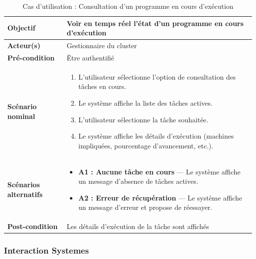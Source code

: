 \documentclass[12pt,a4paper]{report}
\theoremstyle{definition}
\begin{document}
\begin{table}[H]
\centering
\renewcommand{\arraystretch}{1.3}

\begin{tabular}{|p{4cm}|p{11cm}|}
\hline

\textbf{Objectif} & Voir en temps réel l'état d'un programme en cours d'exécution \\ 
\hline

\textbf{Acteur(s)} & Gestionnaire du cluster \\ 
\hline

\textbf{Pré-condition} & Être authentifié \\ 
\hline

\textbf{Scénario nominal} & 
\begin{enumerate}
    \item L'utilisateur sélectionne l'option de consultation des tâches en cours.
    \item Le système affiche la liste des tâches actives.
    \item L'utilisateur sélectionne la tâche souhaitée.
    \item Le système affiche les détails d'exécution (machines impliquées, pourcentage d'avancement, etc.).
\end{enumerate} \\ 
\hline

\textbf{Scénarios alternatifs} & 
\begin{itemize}
    \item \textbf{A1 : Aucune tâche en cours} — Le système affiche un message d'absence de tâches actives.
    \item \textbf{A2 : Erreur de récupération} — Le système affiche un message d'erreur et propose de réessayer.
\end{itemize} \\ 
\hline

\textbf{Post-condition} & Les détails d'exécution de la tâche sont affichés \\ 
\hline

\end{tabular}

\caption{Cas d’utilisation : Consultation d’un programme en cours d’exécution}
\label{tab:view_program}
\end{table}

\subsubsection{Interaction Systemes}
\end{document}

